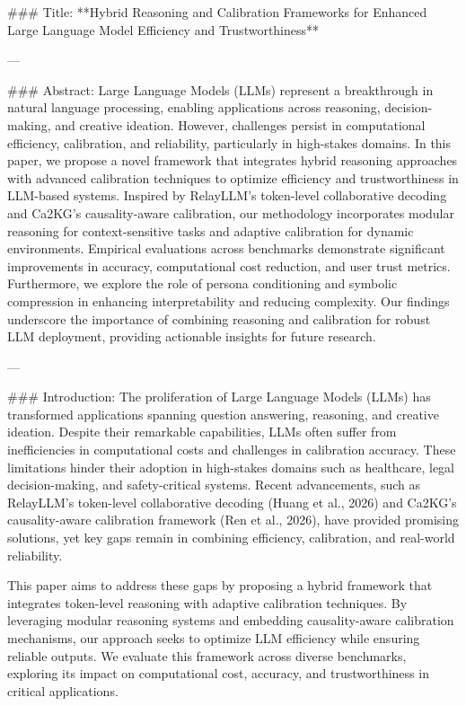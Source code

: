 ### Title:
**Hybrid Reasoning and Calibration Frameworks for Enhanced Large Language Model Efficiency and Trustworthiness**

---

### Abstract:
Large Language Models (LLMs) represent a breakthrough in natural language processing, enabling applications across reasoning, decision-making, and creative ideation. However, challenges persist in computational efficiency, calibration, and reliability, particularly in high-stakes domains. In this paper, we propose a novel framework that integrates hybrid reasoning approaches with advanced calibration techniques to optimize efficiency and trustworthiness in LLM-based systems. Inspired by RelayLLM's token-level collaborative decoding and Ca2KG's causality-aware calibration, our methodology incorporates modular reasoning for context-sensitive tasks and adaptive calibration for dynamic environments. Empirical evaluations across benchmarks demonstrate significant improvements in accuracy, computational cost reduction, and user trust metrics. Furthermore, we explore the role of persona conditioning and symbolic compression in enhancing interpretability and reducing complexity. Our findings underscore the importance of combining reasoning and calibration for robust LLM deployment, providing actionable insights for future research.

---

### Introduction:
The proliferation of Large Language Models (LLMs) has transformed applications spanning question answering, reasoning, and creative ideation. Despite their remarkable capabilities, LLMs often suffer from inefficiencies in computational costs and challenges in calibration accuracy. These limitations hinder their adoption in high-stakes domains such as healthcare, legal decision-making, and safety-critical systems. Recent advancements, such as RelayLLM's token-level collaborative decoding (Huang et al., 2026) and Ca2KG's causality-aware calibration framework (Ren et al., 2026), have provided promising solutions, yet key gaps remain in combining efficiency, calibration, and real-world reliability.

This paper aims to address these gaps by proposing a hybrid framework that integrates token-level reasoning with adaptive calibration techniques. By leveraging modular reasoning systems and embedding causality-aware calibration mechanisms, our approach seeks to optimize LLM efficiency while ensuring reliable outputs. We evaluate this framework across diverse benchmarks, exploring its impact on computational cost, accuracy, and trustworthiness in critical applications.

